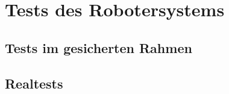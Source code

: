 \chapter{Tests des Robotersystems}
\label{cha:Tests}
\section{Tests im gesicherten Rahmen}

\section{Realtests}